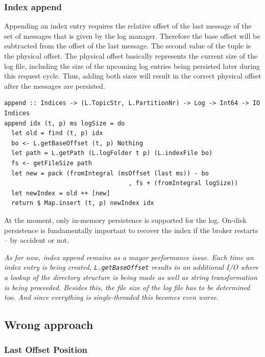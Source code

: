 \subsubsection{Index append}

Appending an index entry requires the relative offset of the last message
of the set of messages that is given by the log manager. Therefore the base
offset will be subtracted from the offset of the last message. The second value
of the tuple is the physical offset. The physical offset basically represents
the current size of the log file, including the size of the upcoming log
entries being persisted later during this request cycle. Thus, adding both sizes
will result in the correct physical offset after the messages are persisted.

\begin{lstlisting}
append :: Indices -> (L.TopicStr, L.PartitionNr) -> Log -> Int64 -> IO Indices
append idx (t, p) ms logSize = do
  let old = find (t, p) idx
  bo <- L.getBaseOffset (t, p) Nothing 
  let path = L.getPath (L.logFolder t p) (L.indexFile bo)
  fs <- getFileSize path
  let new = pack (fromIntegral (msOffset (last ms)) - bo
                                  , fs + (fromIntegral logSize)) 
  let newIndex = old ++ [new]
  return $ Map.insert (t, p) newIndex idx
\end{lstlisting}

At the moment, only in-memory persistence is supported for the log. On-disk
persistence is fundamentally important to recover the index if the broker
restarts -- by accident or not.

\textit{As for now, index append remains as a mayor performance issue. Each
  time an index entry is being created, \lstinline{L.getBaseOffset} results in
  an additional I/O where a lookup of the directory structure is being made as
  well as string transformation is being proceeded. Besides this, the file size
of the log file has to be determined too. And since everything is
single-threaded this becomes even worse.}

\subsection{Wrong approach}
\subsubsection{Last Offset Position}

